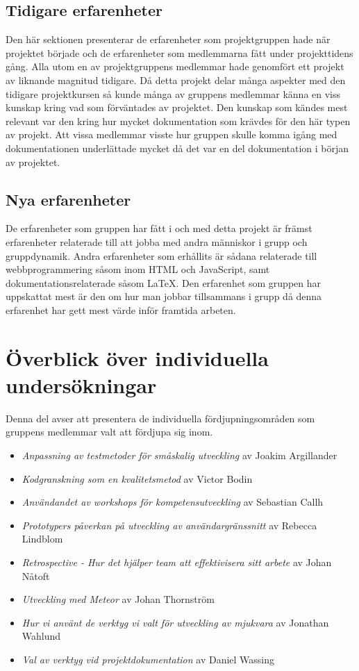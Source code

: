 \subsection{Tidigare erfarenheter}
Den här sektionen presenterar de erfarenheter som projektgruppen hade när projektet började och de erfarenheter som medlemmarna fått under projekttidens gång.
Alla utom en av projektgruppens medlemmar hade genomfört ett projekt av liknande magnitud tidigare. Då detta projekt delar många aspekter med den tidigare projektkursen så kunde många av gruppens medlemmar känna en viss kunskap kring vad som förväntades av projektet. Den kunskap som kändes mest relevant var den kring hur mycket dokumentation som krävdes för den här typen av projekt. Att vissa medlemmar visste hur gruppen skulle komma igång med dokumentationen underlättade mycket då det var en del dokumentation i början av projektet.

\subsection{Nya erfarenheter}
De erfarenheter som gruppen har fått i och med detta projekt är främst erfarenheter relaterade till att jobba med andra människor i grupp och gruppdynamik. Andra erfarenheter som erhållits är sådana relaterade till webbprogrammering såsom inom HTML och JavaScript, samt dokumentationsrelaterade såsom LaTeX. Den erfarenhet som gruppen har uppskattat mest är den om hur man jobbar tillsammans i grupp då denna erfarenhet har gett mest värde inför framtida arbeten.


\section{Överblick över individuella undersökningar}
\label{sec:result-individual}
Denna del avser att presentera de individuella fördjupningsområden som gruppens medlemmar valt att fördjupa sig inom.

\begin{itemize}
\item \textit{Anpassning av testmetoder för småskalig utveckling} av Joakim Argillander
\item \textit{Kodgranskning som en kvalitetsmetod} av Victor Bodin
\item \textit{Användandet av workshops för kompetensutveckling} av Sebastian Callh
\item \textit{Prototypers påverkan på utveckling av användargränssnitt} av Rebecca Lindblom
\item \textit{Retrospective - Hur det hjälper team att effektivisera sitt arbete} av Johan Nåtoft
\item \textit{Utveckling med Meteor} av Johan Thornström
\item \textit{Hur vi använt de verktyg vi valt för utveckling av mjukvara} av Jonathan Wahlund
\item \textit{Val av verktyg vid projektdokumentation} av Daniel Wassing
\end{itemize}

